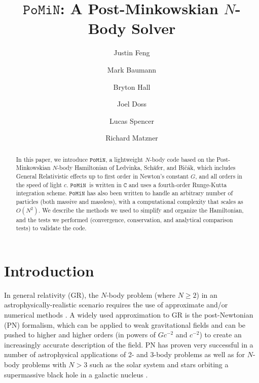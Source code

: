 \documentclass[aps,onecolumn,notitlepage,eqsecnum,nofootinbib,floatfix,superscriptaddress]{revtex4-1}
\newcommand{\codename}{\mathtt{PoMiN}}
\begin{document}
\title{$\codename$: A Post-Minkowskian $N$-Body Solver}

\author{Justin Feng}
\author{Mark Baumann}
\author{Bryton Hall}
\noaffiliation
\author{Joel Doss}
\author{Lucas Spencer}
\noaffiliation
\author{Richard Matzner}


\begin{abstract}
In this paper, we introduce $\codename$, a lightweight $N$-body code based on the Post-Minkowskian $N$-body Hamiltonian of Ledvinka, Sch{\"a}fer, and Bi{\v c}{\'a}k, which includes General Relativistic effects up to first order in Newton's constant $G$, and all orders in the speed of light $c$. $\codename \> $  is written in $\mathtt{C}$ and uses a fourth-order Runge-Kutta integration scheme. $\codename$ has also been written to handle an arbitrary number of particles (both massive and massless), with a computational complexity that scales as $O(N^2)$. We describe the methods we used to simplify and organize the Hamiltonian, and the tests we performed (convergence, conservation, and analytical comparison tests) to validate the code.
\end{abstract}

\maketitle


\section{Introduction}

In general relativity (GR), the $N$-body problem (where $N \geq 2$) in an astrophysically-realistic scenario requires the use of approximate and/or numerical methods \cite{PoissonWill}.  A widely used approximation to GR is the post-Newtonian (PN) formalism, which can be applied to weak gravitational fields and can be pushed to higher and higher orders (in powers of $G c^{-2}$ and $c^{-2}$) to create an increasingly accurate description of the field.  PN has proven very successful in a number of astrophysical applications of 2- and 3-body problems as well as for $N$-body problems with $N>3$ such as the solar system \cite{Kopeikin} and stars orbiting a supermassive black hole in a galactic nucleus \cite{Hamers} \cite{MikkolaMerritt}.
\end{document}
